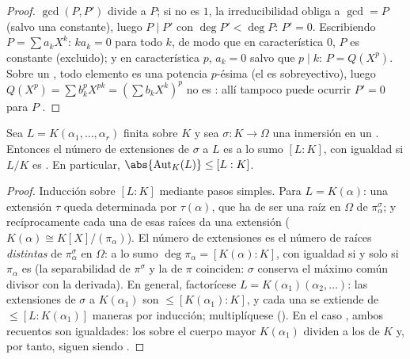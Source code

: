 \begin{proof}
$\gcd(P, P')$ divide a $P$; si no es $1$, la irreducibilidad obliga a
$\gcd = P$ (salvo una constante), luego $P \mid P'$ con $\deg
P' < \deg P$: $P' = 0$. Escribiendo $P = \sum a_kX^k$: $ka_k = 0$ para
todo $k$, de modo que en característica $0$, $P$ es constante
(excluido); y en característica $p$, $a_k = 0$ salvo que $p \mid k$:
$P =
Q(X^p)$. Sobre un ,
todo elemento es una potencia $p$-ésima (el
 es sobreyectivo), luego
$Q(X^p) = \sum b_k^p X^{pk} = (\sum
b_kX^k)^p$ no es : allí
tampoco puede ocurrir $P' = 0$ para $P$
.
\end{proof}

\begin{proposition}\label{prop:b3:galois:embeddings}
Sea $L = K(\alpha_1, \dots, \alpha_r)$ finita sobre $K$ y sea
$\sigma \colon K \to \Omega$ una inmersión en un
. Entonces
el número de extensiones de $\sigma$ a $L$ es a lo sumo $[L:K]$, con
igualdad si $L/K$ es . En
particular, $\abs{\operatorname{Aut}_K(L)} \leq [L:K]$.
\end{proposition}

\begin{proof}
Inducción sobre $[L:K]$ mediante pasos simples. Para $L = K(\alpha)$:
una extensión $\tau$ queda determinada por $\tau(\alpha)$, que ha de ser
una raíz en $\Omega$ de $\pi_\alpha^\sigma$; y recíprocamente cada una
de esas raíces da una extensión ($K(\alpha) \cong K[X]/(\pi_\alpha)$).
El número de extensiones es el número de raíces \emph{distintas} de
$\pi_\alpha^\sigma$ en $\Omega$: a lo sumo $\deg\pi_\alpha =
[K(\alpha):K]$, con igualdad si y solo si $\pi_\alpha$ es
 (la separabilidad de
$\pi^\sigma$ y la de $\pi$ coinciden: $\sigma$ conserva el máximo común
divisor con la derivada). En general, factorícese $L =
K(\alpha_1)(\alpha_2, \dots)$: las extensiones de $\sigma$ a
$K(\alpha_1)$ son $\leq [K(\alpha_1):K]$, y cada una se extiende de
$\leq [L : K(\alpha_1)]$ maneras por inducción; multiplíquese
(). En el caso
, ambos recuentos son
igualdades: los 
sobre el cuerpo mayor $K(\alpha_1)$ dividen a los de $K$ y, por tanto,
siguen siendo .
\end{proof}

